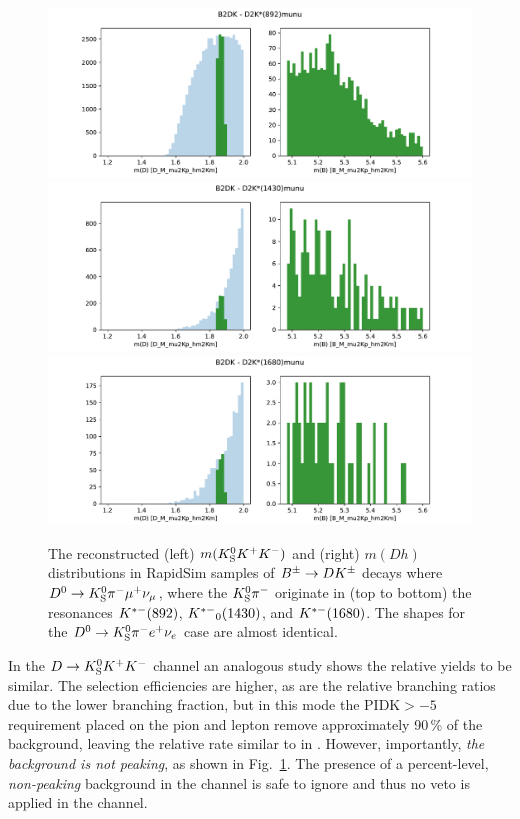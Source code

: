 \begin{figure}[tbp]
    \centering
    \includegraphics[width=0.6\columnwidth]{figures/analysis/semileptonic_bkgs/D2Kstar_892_munu_kskk.pdf}
    \includegraphics[width=0.6\columnwidth]{figures/analysis/semileptonic_bkgs/D2Kstar_1430_munu_kskk.pdf}
    \includegraphics[width=0.6\columnwidth]{figures/analysis/semileptonic_bkgs/D2Kstar_1680_munu_kskk.pdf}
    \caption{The reconstructed (left) $m({{K}^0_{\mathrm{S}}} K^+ K^-)$ and (right) $m(Dh)$ distributions in RapidSim samples of ${{B}^\pm}\rightarrow{\ensuremath{D}} {\ensuremath{{K}^\pm}}$ decays where ${{D}^0}\rightarrow{\ensuremath{{K}^0_{\mathrm{S}}}}\pi^-\mu^+\nu_\mu$, where the ${{K}^0_{\mathrm{S}}}{{\pi}^-}$ originate in (top to bottom) the resonances ${{K}^{*-}}(892)$, ${{K}^{*-}}_0(1430)$, and ${{K}^{*-}}(1680)$. The shapes for the ${{D}^0}\rightarrow{\ensuremath{{K}^0_{\mathrm{S}}}}\pi^-e^+\nu_e$ case are almost identical.}
    \label{fig:semileptonic_D_decays_kskk}
\end{figure}


In the ${D}\rightarrow{\ensuremath{{K}^0_{\mathrm{S}}}}{\ensuremath{{K}^+}}{\ensuremath{{K}^-}}$ channel an analogous study shows the relative yields to be similar. The selection efficiencies are higher, as are the relative branching ratios due to the lower \DtoKskk branching fraction, but in this mode the $\text{PIDK}>-5$ requirement placed on the pion and lepton remove approximately 90\,\% of the background, leaving the relative rate similar to in \DtoKspipi. However, importantly, \emph{the background is not peaking}, as shown in Fig.~\ref{fig:semileptonic_D_decays_kskk}. The presence of a percent-level, \emph{non-peaking} background in the \DtoKskk channel is safe to ignore and thus no veto is applied in the \DtoKskk channel.

